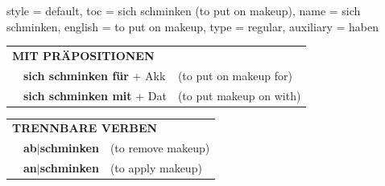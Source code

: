 \begin{verbentry}{
  style = {default},
  toc = {sich schminken (to put on makeup)},
  name = {sich schminken},
  english = {to put on makeup},
  type = {regular},
  auxiliary = {haben}
}
\vspace{10pt}

\begin{tabular}{lll}
\multicolumn{3}{l}{\textbf{MIT PRÄPOSITIONEN}}\\
& \textbf{sich schminken für} + Akk & (to put on makeup for)\\
& \textbf{sich schminken mit} + Dat & (to put makeup on with)\\
\end{tabular}
\hfill
\begin{tabular}{lll}
\multicolumn{3}{l}{\textbf{TRENNBARE VERBEN}}\\
& \textbf{ab$|$schminken} & (to remove makeup)\\
& \textbf{an$|$schminken} & (to apply makeup)\\
\end{tabular}
\vspace{-5pt}
\end{verbentry}

